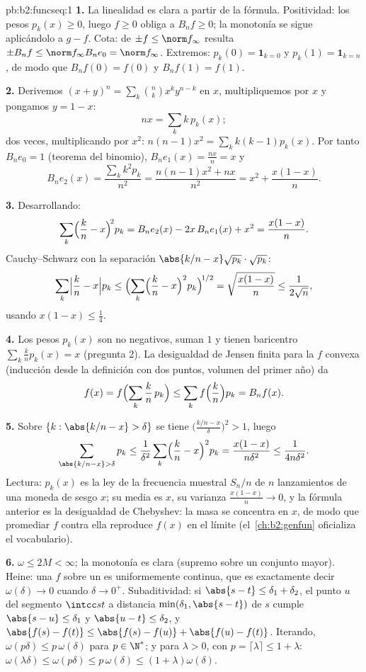 \begin{solution}{pb:b2:funcseq:1}
\textbf{1.} La linealidad es clara a partir de la fórmula.
Positividad: los pesos $p_k(x) \geq 0$, luego $f \geq 0$ obliga a
$B_nf \geq 0$; la monotonía se sigue aplicándolo a $g - f$. Cota:
de $\pm f \leq \norm f_\infty$ resulta $\pm B_nf \leq \norm
f_\infty B_ne_0 = \norm f_\infty$. Extremos: $p_k(0) = \mathbf
1_{k=0}$ y $p_k(1) = \mathbf 1_{k=n}$, de modo que $B_nf(0) =
f(0)$ y $B_nf(1) = f(1)$.

\textbf{2.} Derivemos $(x+y)^n = \sum_k\binom nk x^ky^{n-k}$ en
$x$, multipliquemos por $x$ y pongamos $y = 1 - x$:
\[
nx = \sum_k k\,p_k(x) ;
\]
dos veces, multiplicando por $x^2$: $n(n-1)x^2 = \sum_k
k(k-1)p_k(x)$. Por tanto $B_ne_0 = 1$ (teorema del binomio),
$B_ne_1(x) = \frac{nx}{n} = x$ y
\[
B_ne_2(x) = \frac{\sum_k k^2p_k}{n^2}
= \frac{n(n-1)x^2 + nx}{n^2}
= x^2 + \frac{x(1-x)}{n} .
\]

\textbf{3.} Desarrollando:
\[
\sum_k\Bigl(\frac kn - x\Bigr)^{\!2} p_k
= B_ne_2(x) - 2x\,B_ne_1(x) + x^2
= \frac{x(1-x)}{n} .
\]
Cauchy--Schwarz con la separación $\abs{k/n - x}\sqrt{p_k} \cdot
\sqrt{p_k}$:
\[
\sum_k\Bigl|\frac kn - x\Bigr| p_k
\leq \Bigl(\sum_k\Bigl(\frac kn - x\Bigr)^2
p_k\Bigr)^{\!1/2}
= \sqrt{\frac{x(1-x)}{n}} \leq \frac{1}{2\sqrt n},
\]
usando $x(1-x) \leq \frac14$.

\textbf{4.} Los pesos $p_k(x)$ son no negativos, suman $1$ y tienen
baricentro $\sum_k \frac kn p_k(x) = x$ (pregunta 2). La
desigualdad de Jensen finita para la $f$ convexa (inducción desde
la definición con dos puntos, volumen del primer año) da
\[
f(x) = f\Bigl(\sum_k \frac kn\,p_k\Bigr)
\leq \sum_k f\Bigl(\frac kn\Bigr)p_k = B_nf(x) .
\]

\textbf{5.} Sobre $\{k : \abs{k/n - x} > \delta\}$ se tiene
$\bigl(\frac{k/n - x}{\delta}\bigr)^2 > 1$, luego
\[
\sum_{\abs{k/n-x}>\delta} p_k
\leq \frac{1}{\delta^2}\sum_k\Bigl(\frac kn -
x\Bigr)^2p_k
= \frac{x(1-x)}{n\delta^2} \leq \frac{1}{4n\delta^2} .
\]
Lectura: $p_k(x)$ es la ley de la frecuencia muestral $S_n/n$ de
$n$ lanzamientos de una moneda de sesgo $x$; su media es $x$, su
varianza $\frac{x(1-x)}n \to 0$, y la fórmula anterior es la
desigualdad de Chebyshev: la masa se concentra en $x$, de modo que
promediar $f$ contra ella reproduce $f(x)$ en el límite (el~\cref{ch:b2:genfun} oficializa el vocabulario).

\textbf{6.} $\omega \leq 2M < \infty$; la monotonía es clara
(supremo sobre un conjunto mayor). Heine: una $f$  sobre un
 es uniformemente continua, que es exactamente decir
$\omega(\delta) \to 0$ cuando $\delta \to 0^+$. Subaditividad: si
$\abs{s - t} \leq \delta_1 + \delta_2$, el punto $u$ del segmento
$\intcc st$ a distancia $\min(\delta_1, \abs{s-t})$ de $s$ cumple
$\abs{s-u} \leq \delta_1$ y $\abs{u-t} \leq \delta_2$, y
$\abs{f(s)-f(t)} \leq \abs{f(s)-f(u)} + \abs{f(u)-f(t)}$. Iterando,
$\omega(p\delta) \leq p\,\omega(\delta)$ para $p \in \N^*$; y para
$\lambda > 0$, con $p = \lceil\lambda\rceil \leq 1 + \lambda$:
$\omega(\lambda\delta) \leq \omega(p\delta) \leq p\,\omega(\delta)
\leq (1+\lambda)\omega(\delta)$.


\end{solution}
